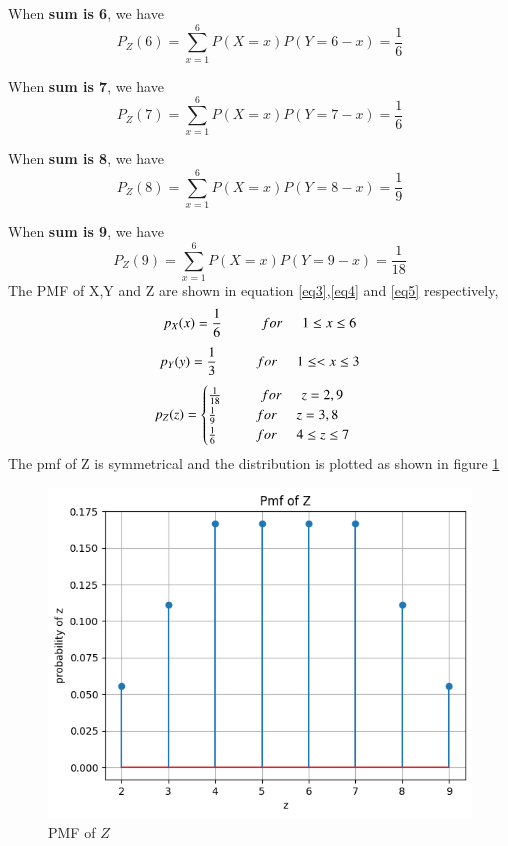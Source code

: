 \documentclass[journal,12pt,twocolumn]{IEEEtran}
\begin{document}
When \textbf{sum is 6}, we have 
\[P_Z(6)= \sum_{x=1}^{6} P(X=x)P(Y=6-x)=\frac{1}{6}\]

When \textbf{sum is 7}, we have 
\[P_Z(7)= \sum_{x=1}^{6} P(X=x)P(Y=7-x)=\frac{1}{6}\]

When \textbf{sum is 8}, we have 
\[P_Z(8)= \sum_{x=1}^{6} P(X=x)P(Y=8-x)=\frac{1}{9}\]

When \textbf{sum is 9}, we have 
\[P_Z(9)= \sum_{x=1}^{6} P(X=x)P(Y=9-x)=\frac{1}{18}\]
The PMF of X,Y and Z are shown in equation \ref{eq3},\ref{eq4} and \ref{eq5} respectively,
\begin{equation}\label{eq3}
     p_X(x) = \frac{1}{6} \hspace{1cm} for\hspace{0.5cm} 1\le x \le6
\end{equation}
\begin{equation}\label{eq4}
     p_Y(y) = \frac{1}{3} \hspace{1cm} for\hspace{0.5cm} 1\le<x\le3
\end{equation}
\begin{equation}\label{eq5}
    p_Z(z)=\begin{cases}
        \frac{1}{18}\hspace{1cm}for\hspace{0.5cm} z=2,9 \\
        \frac{1}{9} \hspace{1cm} for\hspace{0.5cm} z=3,8 \\
        \frac{1}{6} \hspace{1cm} for\hspace{0.5cm} 4\le z \le7 \\
    \end{cases}
\end{equation}
The pmf of Z is symmetrical and the distribution is plotted as shown in figure \ref{z} 
\begin{figure}[h]
    \centering
    \includegraphics[scale=0.6]{pmf_z.png}
    \caption{PMF of \(Z\) }
    \label{z}
\end{figure}\\
\end{document}
